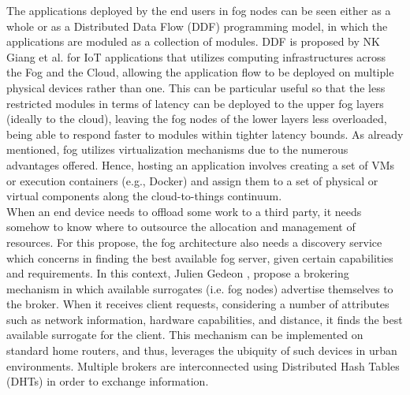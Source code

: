 \noindent\tab The applications deployed by the end users in fog nodes can be seen either as a whole or as a Distributed Data Flow (DDF) programming model, in which the applications are moduled as a collection of modules. DDF is proposed by NK Giang et al. \cite{giang2015developing} for IoT applications that utilizes computing infrastructures across the Fog and the Cloud, allowing the application flow to be deployed on multiple physical devices rather than one. This can be particular useful so that the less restricted modules in terms of latency can be deployed to the upper fog layers (ideally to the cloud), leaving the fog nodes of the lower layers less overloaded, being able to respond faster to modules within tighter latency bounds. As already mentioned, fog utilizes virtualization mechanisms due to the numerous advantages offered. Hence, hosting an application involves creating a set of VMs or execution containers (e.g., Docker) and assign them to a set of physical or virtual components along the cloud-to-things continuum.\\
\noindent\tab When an end device needs to offload some work to a third party, it needs somehow to know where to outsource the allocation and management of resources. For this propose, the fog architecture also needs a discovery service which concerns in finding the best available fog server, given certain capabilities and requirements. In this context, Julien Gedeon \cite{gedeon2017router}, propose a brokering mechanism in which available surrogates (i.e. fog nodes) advertise themselves to the broker. When it receives client requests, considering a number of attributes such as network information, hardware capabilities, and distance, it finds the best available surrogate for the client. This mechanism can be implemented on standard home routers, and thus, leverages the ubiquity of such devices in urban environments. Multiple brokers are interconnected using Distributed Hash Tables (DHTs) in order to exchange information.\\
